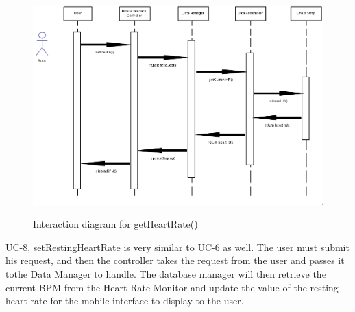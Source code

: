 \documentclass[letterpaper,english, 12pt]{scrreprt}
\begin{document}
\begin{figure}[H]
	\includegraphics[scale=.40]{img/Interaction_Diagrams/setRestingHeartRate.png}\\
	\caption {Interaction diagram for getHeartRate()} 
\end{figure}

UC-8, setRestingHeartRate is very similar to UC-6 as well. The user must submit his request, and then the controller takes the request from the user and passes it tothe Data Manager to handle. The database manager will then retrieve the current BPM from the Heart Rate Monitor and update the value of the resting heart rate for the mobile interface to display to the user. 
\end{document}
